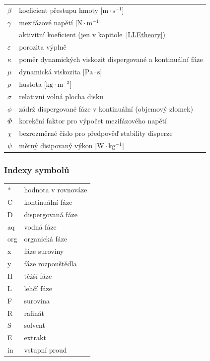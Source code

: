 \documentclass[a4paper, 12pt]{article}
\begin{document}
\begin{tabular}{ll}
	$\beta$ & koeficient přestupu hmoty [$\mathrm{m \cdot s^{-1}}$] \\
	$\gamma$ & mezifázové napětí [$\mathrm{N \cdot m^{-1}}$] \\
	& aktivitní koeficient (jen v kapitole~\ref{LLEtheory}) \\
	$\varepsilon$ & porozita výplně \\
	$\kappa$ & poměr dynamických viskozit dispergované a kontinuální fáze \\
	$\mu$ & dynamická viskozita [$\mathrm{Pa \cdot s}$] \\
	$\rho$ & hustota [$\mathrm{kg \cdot m^{-3}}$] \\
	$\sigma$ & relativní volná plocha disku \\
	$\phi$ & zádrž dispergované fáze v kontinuální (objemový zlomek) \\
	$\Phi$ & korekční faktor pro výpočet mezifázového napětí \\
	$\chi$ & bezrozměrné číslo pro předpověď stability disperze \\
	$\psi$ & měrný disipovaný výkon [$\mathrm{W \cdot kg^{-1}}$] \\
\end{tabular}

\newpage \subsubsection*{Indexy symbolů}
\begin{tabular}{ll}
	* & hodnota v rovnováze \\
	C & kontinuální fáze \\
	D & dispergovaná fáze \\
	aq  & vodná fáze \\
	org & organická fáze \\
	x & fáze suroviny \\
	y & fáze rozpouštědla \\
	H & těžší fáze \\
	L & lehčí fáze \\
	F & surovina \\
	R & rafinát \\
	S & solvent \\
	E & extrakt \\
	in  & vstupní proud \\
\end{tabular}
\end{document}
